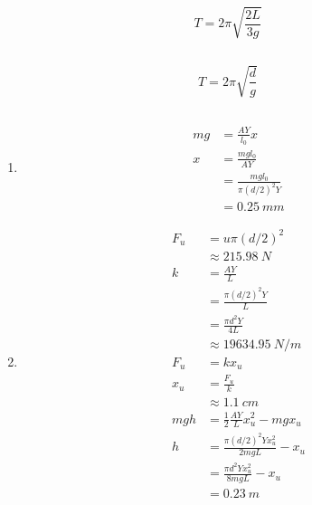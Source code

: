 \documentclass{article}
\begin{document}
\subsection{}

\[T = 2 \pi \sqrt{\frac{2 L}{3 g}}\]

\subsection{}

\[T = 2 \pi \sqrt{\frac{d}{g}}\]

\setcounter{subsection}{7}
\subsection{}

\begin{enumerate}
  \item

        \begin{align*}
          m g & = \frac{A Y}{l_0} x               \\
          x   & = \frac{m g l_0}{A Y}             \\
              & = \frac{m g l_0}{\pi (d / 2)^2 Y} \\
              & = \qty{0.25}{mm}
        \end{align*}

  \item

        \begin{align*}
          F_u   & = u \pi (d / 2)^2                             \\
                & \approx \qty{215.98}{N}                       \\
          k     & = \frac{A Y}{L}                               \\
                & = \frac{\pi (d / 2)^2 Y}{L}                   \\
                & = \frac{\pi d^2 Y}{4 L}                       \\
                & \approx \qty{19634.95}{N/m}                   \\
          F_u   & = k x_u                                       \\
          x_u   & = \frac{F_u}{k}                               \\
                & \approx \qty{1.1}{cm}                         \\
          m g h & = \frac{1}{2} \frac{A Y}{L} x_u^2 - m g x_u   \\
          h     & = \frac{\pi (d / 2)^2 Y x_u^2}{2 m g L} - x_u \\
                & = \frac{\pi d^2 Y x_u^2}{8 m g L} - x_u       \\
                & = \qty{0.23}{m}
        \end{align*}
\end{enumerate}
\end{document}
